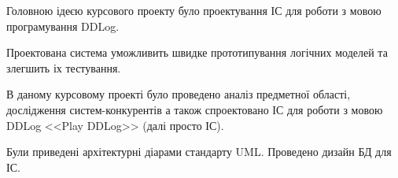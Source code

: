 Головною ідеєю курсового проекту було проектування ІС для роботи з мовою програмування  DDLog. 

Проектована система уможливить швидке прототипування логічних моделей та злегшить іх тестування.

В даному курсовому проекті було проведено аналіз предметної області, дослідження систем-конкурентів а також спроектовано ІС для роботи з мовою DDLog <<Play DDLog>> (далі просто ІС).

Були приведені архітектурні діарами стандарту UML. Проведено дизайн БД для ІС.

